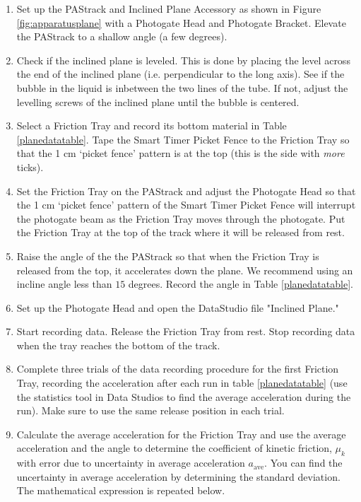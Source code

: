 \begin{enumerate}
    \item Set up the PAStrack and Inclined Plane Accessory as shown in Figure \ref{fig:apparatusplane} with a Photogate Head and Photogate Bracket. Elevate the PAStrack to a shallow angle (a few degrees).
    \item Check if the inclined plane is leveled.  This is done by placing the level across the end of the inclined plane (i.e. perpendicular to the long axis).  See if the bubble in the liquid is inbetween the two lines of the tube.  If not, adjust the levelling screws of the inclined plane until the bubble is centered.
    \item Select a Friction Tray and record its bottom material in Table \ref{planedatatable}. Tape the Smart Timer Picket Fence to the Friction Tray so that the 1 cm `picket fence' pattern is at the top (this is the side with {\it{more}} ticks).
    \item Set the Friction Tray on the PAStrack and adjust the Photogate Head so that the 1 cm `picket fence' pattern of the Smart Timer Picket Fence will interrupt the photogate beam as the Friction Tray moves through the photogate.  Put the Friction Tray at the top of the track where it will be released from rest.
    \item Raise the angle of the the PAStrack so that when the Friction Tray is released from the top, it accelerates down the plane. We recommend using an incline angle less than $15$ degrees. Record the angle in Table \ref{planedatatable}.
    \item Set up the Photogate Head and open the DataStudio file "Inclined Plane."
    \item Start recording data.  Release the Friction Tray from rest.  Stop recording data when the tray reaches the bottom of the track.
    \item Complete three trials of the data recording procedure for the first Friction Tray, recording the acceleration after each run in table \ref{planedatatable} (use the statistics tool in Data Studios to find the average acceleration during the run). Make sure to use the same release position in each trial.
        \item Calculate the average acceleration for the Friction Tray and use the average acceleration and the angle to determine the coefficient of kinetic friction, $\mu_k$ with error due to uncertainty in average acceleration $a_\text{ave}$. You can find the uncertainty in average acceleration by determining the standard deviation. The mathematical expression is repeated below.

\end{enumerate}
